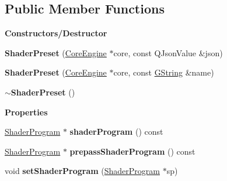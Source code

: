 \subsection*{Public Member Functions}
\begin{Indent}\textbf{ Constructors/\+Destructor}\par
\begin{DoxyCompactItemize}
\item 
\mbox{\label{classrev_1_1_shader_preset_a55d8c336f57bc0d4cd189e828facdb84}} 
{\bfseries Shader\+Preset} (\mbox{\hyperlink{classrev_1_1_core_engine}{Core\+Engine}} $\ast$core, const Q\+Json\+Value \&json)
\item 
\mbox{\label{classrev_1_1_shader_preset_a18d6ffeaad03e1ba4daf0a9ee83a8baf}} 
{\bfseries Shader\+Preset} (\mbox{\hyperlink{classrev_1_1_core_engine}{Core\+Engine}} $\ast$core, const \mbox{\hyperlink{classrev_1_1_g_string}{G\+String}} \&name)
\item 
\mbox{\label{classrev_1_1_shader_preset_a4d47db2a1067ce458cd9b0f41e5094a7}} 
{\bfseries $\sim$\+Shader\+Preset} ()
\end{DoxyCompactItemize}
\end{Indent}
\begin{Indent}\textbf{ Properties}\par
\begin{DoxyCompactItemize}
\item 
\mbox{\label{classrev_1_1_shader_preset_a28ab8a280ef50ff3add67a16b935c994}} 
\mbox{\hyperlink{classrev_1_1_shader_program}{Shader\+Program}} $\ast$ {\bfseries shader\+Program} () const
\item 
\mbox{\label{classrev_1_1_shader_preset_adb158a95a819fa15a21ba62bdb29d21d}} 
\mbox{\hyperlink{classrev_1_1_shader_program}{Shader\+Program}} $\ast$ {\bfseries prepass\+Shader\+Program} () const
\item 
\mbox{\label{classrev_1_1_shader_preset_a59d500a59989e055e5e542af3f05901a}} 
void {\bfseries set\+Shader\+Program} (\mbox{\hyperlink{classrev_1_1_shader_program}{Shader\+Program}} $\ast$sp)
\end{DoxyCompactItemize}
\end{Indent}
